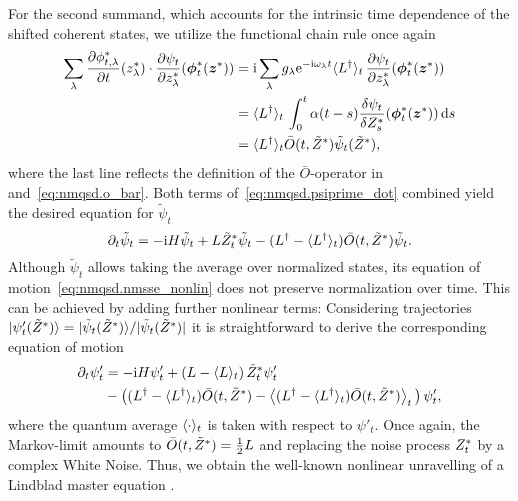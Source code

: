 For the second summand, which accounts for the intrinsic time dependence of the shifted coherent states, we utilize the functional chain rule once again
\begin{align*}
  \sum_\lambda \frac{\partial\ccphitla}{\partial t}(\cc z_\lambda) \cdot \frac{\partial\psi_t}{\partial \cc z_\lambda} (\cc{\vec\phi}_t(\cc\zz))
  &= \ii \sum_\lambda g_\lambda \exp[-\ii \omega_\lambda t] \qmean{\adj L}_t \, \frac{\partial\psi_t}{\partial \cc z_\lambda} (\cc{\vec\phi}_t(\cc\zz)) \\
  &= \qmean{\adj L}_t \, \int_0^t \alpha(t - s) \frac{\delta \psi_t}{\delta \ZZ_s} (\cc{\vec\phi}_t(\cc\zz)) \dd s \\
  &= \qmean{\adj L}_t \bar O(t, \tildeZZ) \tilde\psi_t(\tildeZZ),
\end{align*}
where the last line reflects the definition of the $\bar O$-operator in  and~\ref{eq:nmqsd.o_bar}.
Both terms of~\ref{eq:nmqsd.psiprime_dot} combined yield the desired equation for $\tilde\psi_t$
\begin{equation}
  \partial_t \tilde\psi_t = -\mathrm{i}H \tilde\psi_t + L{\tilde Z}^*_t\tilde\psi_t - (L^\dagger - \langle L^\dagger \rangle_t) \bar O(t, {\tilde Z}^*) \tilde\psi_t.
  \label{eq:nmqsd.nmsse_nonlin}
\end{equation}
Although $\tilde\psi_t$ allows taking the average over normalized states, its equation of motion~\ref{eq:nmqsd.nmsse_nonlin} does not preserve normalization over time.
This can be achieved by adding further nonlinear terms:
Considering trajectories $| \psi'_t({\tilde Z}^*) \rangle = | \tilde\psi_t({\tilde Z}^*) \rangle / \vert \tilde\psi_t({\tilde Z}^*) \vert$ it is straightforward to derive the corresponding equation of motion \cite{DiGiSt98_nmqsd}
\begin{align}
  \partial_t\psi'_t &= -\mathrm{i}H\psi'_t  +  \left(L - \langle L \rangle_t\right) {\tilde Z}^*_t\psi'_t  \nonumber \\
  &-  \left( (L^\dagger - \langle L^\dagger \rangle_t) \bar O(t, {\tilde Z}^*) - \left\langle(L^\dagger - \langle L^\dagger \rangle_t) \bar O(t, {\tilde Z}^*) \right\rangle_t \, \right) \psi'_t,
  \label{eq:nmqsd.nmsse_nonlin_full}
\end{align}
where the quantum average $\langle \cdot \rangle_t$ is taken with respect to $\psi'_t$.
Once again, the Markov-limit amounts to $\bar O(t, {\tilde Z}^*) = \frac{1}{2} L$ and replacing the noise process ${Z}^*_t$ by a complex White Noise.
Thus, we obtain the well-known nonlinear unravelling of a Lindblad master equation \cite{BaGr09_trajectories}.\\



